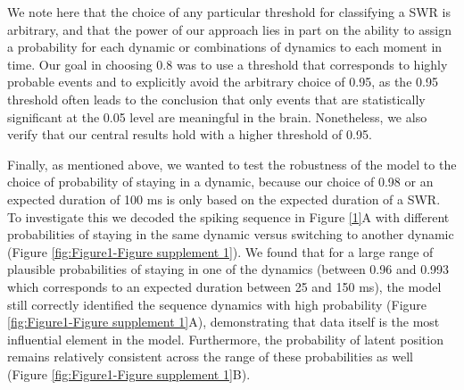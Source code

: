 \documentclass[times, twoside]{zHenriquesLab-StyleBioRxiv}
\begin{document}
We note here that the choice of any particular threshold for classifying a SWR is arbitrary, and that the power of our approach lies in part on the ability to assign a probability for each dynamic or combinations of dynamics to each moment in time. Our goal in choosing 0.8 was to use a threshold that corresponds to highly probable events and to explicitly avoid the arbitrary choice of 0.95, as the 0.95 threshold often leads to the conclusion that only events that are statistically significant at the 0.05 level are meaningful in the brain. Nonetheless, we also verify that our central results hold with a higher threshold of 0.95. 

Finally, as mentioned above, we wanted to test the robustness of the model to the choice of probability of staying in a dynamic, because our choice of 0.98 or an expected duration of 100 ms is only based on the expected duration of a SWR. To investigate this we decoded the spiking sequence in Figure \ref{1}A with different probabilities of staying in the same dynamic versus switching to another dynamic (Figure \ref{fig:Figure1-Figure supplement 1}). We found that for a large range of plausible probabilities of staying in one of the dynamics (between 0.96 and 0.993 which corresponds to an expected duration between 25 and 150 ms), the model still correctly identified the sequence dynamics with high probability (Figure \ref{fig:Figure1-Figure supplement 1}A), demonstrating that data itself is the most influential element in the model. Furthermore, the probability of latent position remains relatively consistent across the range of these probabilities as well (Figure \ref{fig:Figure1-Figure supplement 1}B).
\end{document}
